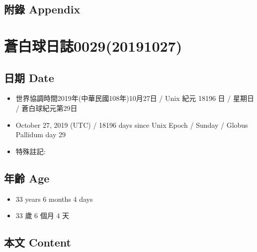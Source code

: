 \documentclass[a5paper, 12pt
]{book}
\providecommand{\tightlist}{%
  \setlength{\itemsep}{0pt}\setlength{\parskip}{0pt}}
\begin{document}
\hypertarget{ux9644ux9304-appendix-20}{%
\subsection{附錄 Appendix}\label{ux9644ux9304-appendix-20}}

\hypertarget{ux84bcux767dux7403ux65e5ux8a8c002920191027}{%
\section{蒼白球日誌0029(20191027)}\label{ux84bcux767dux7403ux65e5ux8a8c002920191027}}

\hypertarget{ux65e5ux671f-date-28}{%
\subsection{日期 Date}\label{ux65e5ux671f-date-28}}

\begin{itemize}
\tightlist
\item
  世界協調時間2019年(中華民國108年)10月27日 / Unix 紀元 18196 日 /
  星期日 / 蒼白球紀元第29日
\item
  October 27, 2019 (UTC) / 18196 days since Unix Epoch / Sunday / Globus
  Pallidum day 29
\item
  特殊註記:
\end{itemize}

\hypertarget{ux5e74ux9f61-age-28}{%
\subsection{年齡 Age}\label{ux5e74ux9f61-age-28}}

\begin{itemize}
\tightlist
\item
  33 years 6 months 4 days
\item
  33 歲 6 個月 4 天
\end{itemize}

\hypertarget{ux672cux6587-content-28}{%
\subsection{本文 Content}\label{ux672cux6587-content-28}}
\end{document}
